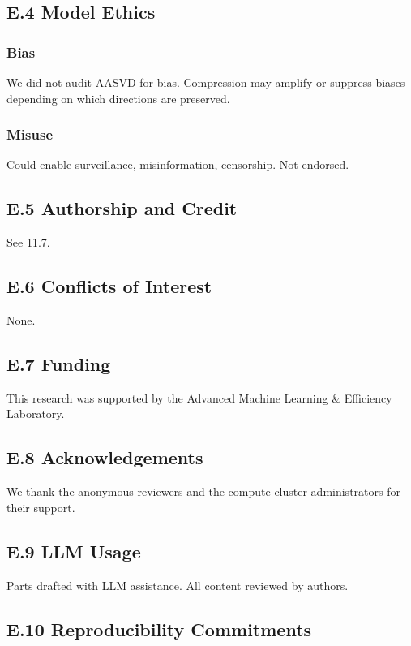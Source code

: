 \subsection{E.4 Model Ethics}

\subsubsection{Bias}

We did not audit AASVD for bias. Compression may amplify or suppress biases 
depending on which directions are preserved.

\subsubsection{Misuse}

Could enable surveillance, misinformation, censorship. Not endorsed.

\subsection{E.5 Authorship and Credit}

See  11.7.

\subsection{E.6 Conflicts of Interest}

None.

\subsection{E.7 Funding}

This research was supported by the Advanced Machine Learning & Efficiency Laboratory.

\subsection{E.8 Acknowledgements}

We thank the anonymous reviewers and the compute cluster administrators for their support.

\subsection{E.9 LLM Usage}

Parts drafted with LLM assistance. All content reviewed by authors.

\subsection{E.10 Reproducibility Commitments}

